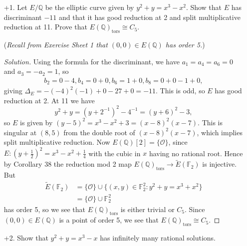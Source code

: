 \documentclass[a4paper]{article}
\theoremstyle{definition}
\newcommand{\tors}{\mathrm{tors}}
\renewcommand{\O}{\mathcal{O}}
\newcommand{\F}{\mathbb{F}}
\newcommand{\Q}{\mathbb{Q}}
\begin{document}
\begin{enumerate}
    \item[+1.] Let $E/\Q$ be the elliptic curve given by $y^2+y=x^3-x^2$. Show
        that $E$ has discriminant $-11$ and that it has good reduction at 2 and
        split multiplicative reduction at 11. Prove that $E(\Q)_\tors\cong C_5$.

        (\textit{Recall from Exercise Sheet 1 that $(0,0)\in E(\Q)$ has order
        5.})

        \begin{proof}[Solution]
            Using the formula for the discriminant, we have $a_1=a_4=a_6=0$ and
            $a_3=-a_2=1$, so
            \begin{align*}
                b_2=0-4, b_4=0+0, b_6=1+0, b_8=0+0-1+0,
            \end{align*}
            giving $\Delta_E = -(-4)^2(-1) + 0 - 27 + 0 = -11$. This is odd, so
            $E$ has good reduction at 2. At 11 we have
            \begin{equation*}
                y^2+y = (y+2^{-1})^2-4^{-1} = (y+6)^2-3,
            \end{equation*}
            so $E$ is given by $(y-5)^2=x^3-x^2+3=(x-8)^2(x-7)$. This is
            singular at $(8,5)$ from the double root of $(x-8)^2(x-7)$, which
            implies split multiplicative reduction. Now $E(\Q)[2]=\{\O\}$, since
            $E:(y+\frac{1}{2})^2=x^3-x^2+\frac{1}{4}$ with the cubic in $x$
            having no rational root. Hence by Corollary 38 the reduction mod 2
            map $E(\Q)_\tors\to\tilde E(\F_2)$ is injective. But
            \begin{align*}
                \tilde E(\F_2)
                    &= \{\O\} \cup \{(x,y)\in\F_2^2:y^2+y=x^3+x^2\} \\
                    &= \{\O\} \cup \F_2^2
            \end{align*}
            has order 5, so we see that $E(\Q)_\tors$ is either trivial or
            $C_5$. Since $(0,0)\in E(\Q)$ is a point of order 5, we see that
            $E(\Q)_\tors\cong C_5$.
        \end{proof}

    \item[+2.] Show that $y^2+y=x^3-x$ has infinitely many rational solutions.


\end{enumerate}
\end{document}
